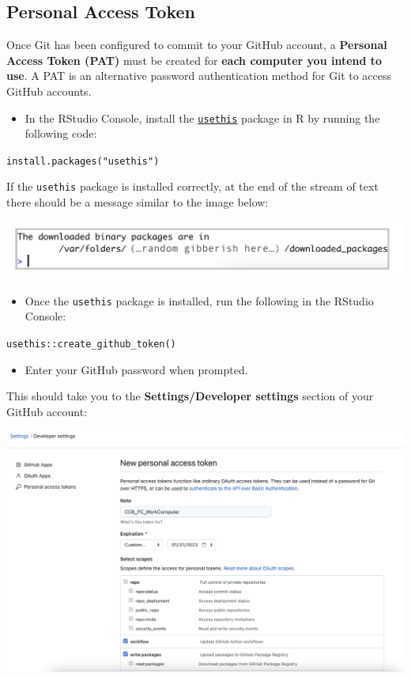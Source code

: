 \documentclass[
]{book}
\providecommand{\tightlist}{%
  \setlength{\itemsep}{0pt}\setlength{\parskip}{0pt}}
\begin{document}
\hypertarget{personal-access-token}{%
\subsection{Personal Access Token}\label{personal-access-token}}

Once Git has been configured to commit to your GitHub account, a \textbf{Personal Access Token (PAT)} must be created for \textbf{each computer you intend to use}. A PAT is an alternative password authentication method for Git to access GitHub accounts.

\begin{itemize}
\tightlist
\item
  In the RStudio Console, install the \href{https://usethis.r-lib.org/}{\texttt{usethis}} package in R by running the following code:
\end{itemize}

\texttt{install.packages("usethis")}

If the \texttt{usethis} package is installed correctly, at the end of the stream of text there should be a message similar to the image below:

\begin{flushleft}\includegraphics[width=0.8\linewidth]{images/usethis} \end{flushleft}

\begin{itemize}
\tightlist
\item
  Once the \texttt{usethis} package is installed, run the following in the RStudio Console:
\end{itemize}

\texttt{usethis::create\_github\_token()}

\begin{itemize}
\tightlist
\item
  Enter your GitHub password when prompted.
\end{itemize}

This should take you to the \textbf{Settings/Developer settings} section of your GitHub account:

\begin{flushleft}\includegraphics[width=0.8\linewidth]{images/pat} \end{flushleft}
\end{document}
